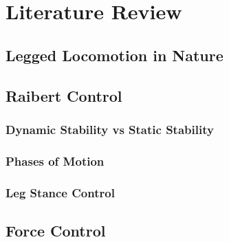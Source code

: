\chapter{Literature Review}
\section{Legged Locomotion in Nature}
\section{Raibert Control}
\cite{Raibert1977}
\cite{Raibert1984}
\cite{Raibert1989}

\subsection{Dynamic Stability vs Static Stability}
\subsection{Phases of Motion}
\subsection{Leg Stance Control}
\section{Force Control}
